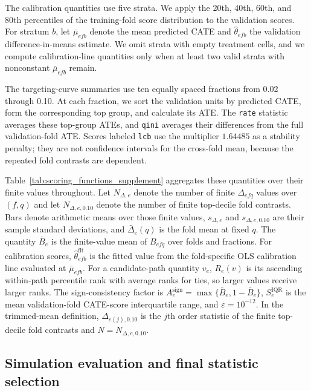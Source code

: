 \documentclass[12pt]{article}
\begin{document}
The calibration quantities use five strata. We apply the 20th, 40th, 60th, and 80th percentiles of the training-fold score distribution to the validation scores. For stratum $b$, let $\bar{\mu}_{efb}$ denote the mean predicted CATE and $\widehat{\theta}_{efb}$ the validation difference-in-means estimate. We omit strata with empty treatment cells, and we compute calibration-line quantities only when at least two valid strata with nonconstant $\bar{\mu}_{efb}$ remain.

The targeting-curve summaries use ten equally spaced fractions from 0.02 through 0.10. At each fraction, we sort the validation units by predicted CATE, form the corresponding top group, and calculate its ATE. The \texttt{rate} statistic averages these top-group ATEs, and \texttt{qini} averages their differences from the full validation-fold ATE. Scores labeled \texttt{lcb} use the multiplier $1.64485$ as a stability penalty; they are not confidence intervals for the cross-fold mean, because the repeated fold contrasts are dependent.

Table~\ref{tab:scoring_functions_supplement} aggregates these quantities over their finite values throughout. Let $N_{\Delta,e}$ denote the number of finite $\Delta_{efq}$ values over $(f,q)$ and let $N_{\Delta,e,0.10}$ denote the number of finite top-decile fold contrasts. Bars denote arithmetic means over those finite values, $s_{\Delta,e}$ and $s_{\Delta,e,0.10}$ are their sample standard deviations, and $\bar\Delta_e(q)$ is the fold mean at fixed $q$. The quantity $\bar B_e$ is the finite-value mean of $B_{efq}$ over folds and fractions. For calibration scores, $\widehat{\theta}_{efb}^{\text{fit}}$ is the fitted value from the fold-specific OLS calibration line evaluated at $\bar{\mu}_{efb}$. For a candidate-path quantity $v_e$, $R_e(v)$ is its ascending within-path percentile rank with average ranks for ties, so larger values receive larger ranks. The sign-consistency factor is $A^{\mathrm{sign}}_e=\max\{\bar B_e,1-\bar B_e\}$, $S^{\mathrm{IQR}}_e$ is the mean validation-fold CATE-score interquartile range, and $\varepsilon=10^{-12}$. In the trimmed-mean definition, $\Delta_{e(j),0.10}$ is the $j$th order statistic of the finite top-decile fold contrasts and $N=N_{\Delta,e,0.10}$.

\begingroup{}

\endgroup

\subsection{Simulation evaluation and final statistic selection}
\end{document}
